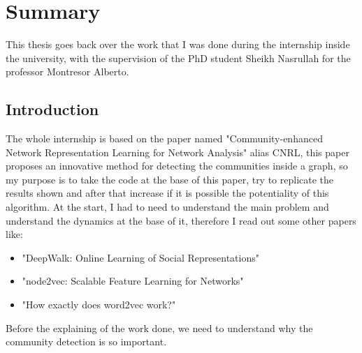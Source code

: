 \documentclass[epsfig,a4paper,11pt,titlepage,twoside,openany]{book}
\begin{document}
	
	\newcommand{\mmax}[0]{mod\_withMax}
	\newcommand{\mover}[0]{mod\_overlap }
	\newcommand{\mmod}[0]{modified modularity}
\fi					%
%
\chapter{Summary}
This thesis goes back over the work that I was done during the internship inside the university, with the supervision of the PhD student Sheikh Nasrullah for the professor Montresor Alberto.
%
\section{Introduction}
The whole internship is based on the paper named "Community-enhanced Network Representation Learning for Network Analysis" alias CNRL, this paper proposes an innovative method for detecting the communities inside a graph, so my purpose is to take the code at the base of this paper, try to replicate the results shown and after that increase if it is possible the potentiality of this algorithm.\newline
At the start, I had to need to understand the main problem and understand the dynamics at the base of it, therefore I read out some other papers like:
\begin{itemize}
	\item "DeepWalk: Online Learning of Social Representations"
	\item "node2vec: Scalable Feature Learning for Networks"
	\item "How exactly does word2vec work?"
\end{itemize} 
Before the explaining of the work done, we need to understand why the community detection is so important.
%
\end{document}
